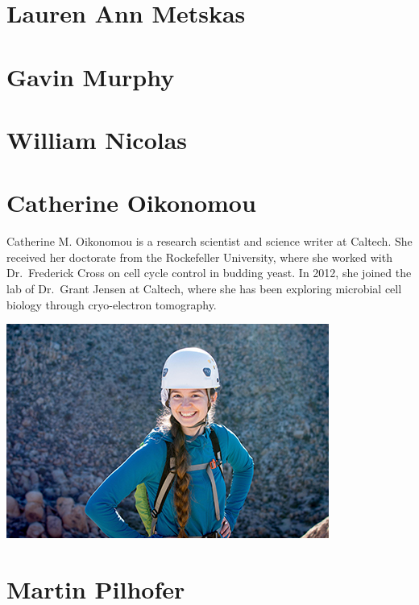\documentclass[]{tufte-book}
\begin{document}
\hypertarget{lauren_ann_metskas}{%
\section*{Lauren Ann Metskas}\label{lauren_ann_metskas}}

\hypertarget{gavin_murphy}{%
\section*{Gavin Murphy}\label{gavin_murphy}}

\hypertarget{william_nicolas}{%
\section*{William Nicolas}\label{william_nicolas}}

\hypertarget{catherine_oikonomou}{%
\section*{Catherine Oikonomou}\label{catherine_oikonomou}}

Catherine M. Oikonomou is a research scientist and science writer at Caltech. She received her doctorate from the Rockefeller University, where she worked with Dr.~Frederick Cross on cell cycle control in budding yeast. In 2012, she joined the lab of Dr.~Grant Jensen at Caltech, where she has been exploring microbial cell biology through cryo-electron tomography.

\includegraphics{img/bios/catherine_oikonomou}

\hypertarget{martin_pilhofer}{%
\section*{Martin Pilhofer}\label{martin_pilhofer}}
\end{document}
